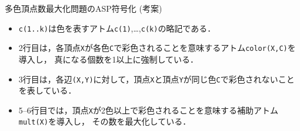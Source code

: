 \documentclass[dvipdfmx,11pt]{beamer}
\newcommand{\code}[1]{\lstinline[basicstyle=\ttfamily]{#1}}
\begin{document}
\begin{frame}{多色頂点数最大化問題のASP符号化 (考案)}

\begin{exampleblock}{}
 
\end{exampleblock}

 \begin{itemize}
  \item \code{c(1..k)}は色を表すアトム\code{c(1)},\ldots,\code{c(k)}の略記である．
  \item 2行目は，各頂点\code{X}が各色\code{C}で彩色されることを意味するアトム\code{color(X,C)}を導入し，
        真になる個数を1以上に強制している．
  \item 3行目は，各辺\code{(X,Y)}に対して，頂点\code{X}と頂点\code{Y}が同じ色\code{C}で彩色されないことを表している．
  \item 5--6行目では，頂点\code{X}が2色以上で彩色されることを意味する補助アトム\code{mult(X)}を導入し，
        その数を最大化している．


 \end{itemize}

\end{frame}

\end{document}
